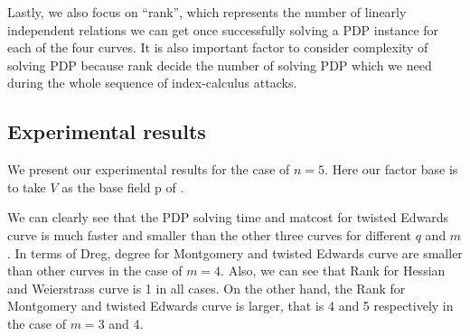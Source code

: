 Lastly, we also focus on ``rank'', which represents the number of 
linearly independent relations we can get once successfully 
solving a PDP instance for each of the four curves.
%
It is also important factor to consider complexity of solving PDP
because rank decide the number of solving PDP which we need 
during the whole sequence of index-calculus attacks.


\subsection{Experimental results}

We present our experimental results for the case of $n=5$.
%
Here our factor base is to take $V$ as the base field \F p of .
%


We can clearly see that the PDP solving time and matcost for twisted 
Edwards curve is much faster and smaller than the other three curves 
for different $q$ and $m$.
%
In terms of Dreg, degree for Montgomery and twisted Edwards curve are 
smaller than other curves in the case of $m=4$.
%
Also, we can see that Rank for Hessian and Weierstrass curve is 
1 in all cases.
%
On the other hand, the Rank for Montgomery and twisted Edwards curve
is larger, that is 4 and 5 respectively in the case of $m=3$ and 4.
%







